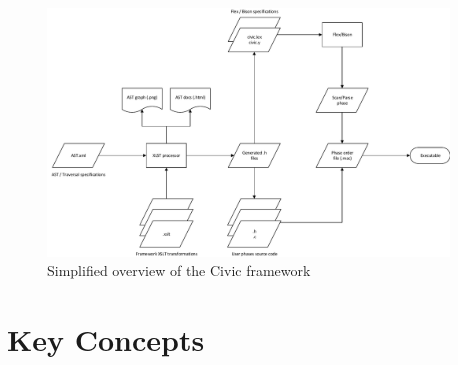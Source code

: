 \documentclass[twoside,openright]{uva-bachelor-thesis}
\begin{document}
		\begin{figure}[H]
			\centering
			\includegraphics[width=0.95\textwidth]{figures/architecture/overview.pdf}
			\caption{Simplified overview of the Civic framework}
			\label{fig:build-dep}
		\end{figure}
		
	\section{Key Concepts}
\end{document}
